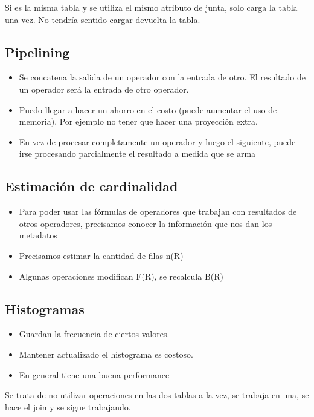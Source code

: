 Si es la misma tabla y se utiliza el mismo atributo de junta, solo carga la tabla una vez. No tendría sentido cargar devuelta la tabla.


\subsection*{Pipelining}
\begin{itemize}
\item Se concatena la salida de un operador con la entrada de otro. El resultado de un operador será la entrada de otro operador.
\item Puedo llegar a hacer un ahorro en el costo (puede aumentar el uso de memoria). Por ejemplo no tener que hacer una proyección extra.
\item En vez de procesar completamente un operador y luego el siguiente, puede irse procesando parcialmente el resultado a medida que se arma
\end{itemize}



\subsection*{Estimación de cardinalidad}
\begin{itemize}
\item Para poder usar las fórmulas de operadores que trabajan con resultados de otros operadores, precisamos conocer la información que nos dan los metadatos
\item Precisamos estimar la cantidad de filas n(R) 
\item Algunas operaciones modifican F(R), se recalcula B(R)
\end{itemize}



\subsection*{Histogramas}
\begin{itemize}
\item Guardan la frecuencia de ciertos valores.
\item Mantener actualizado el histograma es costoso.
\item En general tiene una buena performance
\end{itemize}






Se trata de no utilizar operaciones en las dos tablas a la vez, se trabaja en una, se hace el join y se sigue trabajando.


\newpage